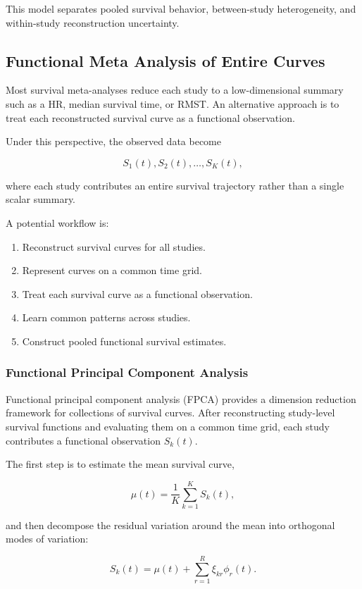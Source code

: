 \documentclass[11pt]{article}
\begin{document}
This model separates pooled survival behavior, between-study heterogeneity, and within-study reconstruction uncertainty.

\subsection{Functional Meta Analysis of Entire Curves}

Most survival meta-analyses reduce each study to a low-dimensional summary such as a HR, median survival time, or RMST. An alternative approach is to treat each reconstructed survival curve as a functional observation.

Under this perspective, the observed data become

\[
S_1(t), S_2(t), \ldots, S_K(t),
\]

where each study contributes an entire survival trajectory rather than a single scalar summary.

A potential workflow is:

\begin{enumerate}
\item Reconstruct survival curves for all studies.
\item Represent curves on a common time grid.
\item Treat each survival curve as a functional observation.
\item Learn common patterns across studies.
\item Construct pooled functional survival estimates.
\end{enumerate}

\subsubsection*{Functional Principal Component Analysis}

Functional principal component analysis (FPCA) provides a dimension reduction framework for collections of survival curves. After reconstructing study-level survival functions and evaluating them on a common time grid, each study contributes a functional observation \(S_k(t)\).

The first step is to estimate the mean survival curve,

\[
\mu(t)=\frac{1}{K}\sum_{k=1}^{K}S_k(t),
\]

and then decompose the residual variation around the mean into orthogonal modes of variation:

\[
S_k(t)=\mu(t)+\sum_{r=1}^{R}\xi_{kr}\phi_r(t).
\]
\end{document}
